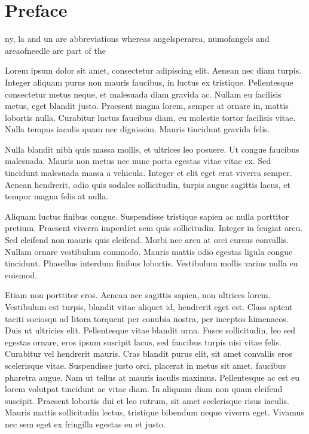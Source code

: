 \chapter*{Preface}

\gls{ny}, \gls{la} and \gls{un} are abbreviations whereas
\gls{angelsperarea}, \gls{numofangels} and \gls{areaofneedle} are part of the %

Lorem ipsum dolor sit amet, consectetur adipiscing elit. Aenean nec diam turpis. Integer aliquam purus non mauris faucibus, in luctus ex tristique. Pellentesque consectetur metus neque, et malesuada diam gravida ac. Nullam eu facilisis metus, eget blandit justo. Praesent magna lorem, semper at ornare in, mattis lobortis nulla. Curabitur luctus faucibus diam, eu molestie tortor facilisis vitae. Nulla tempus iaculis quam nec dignissim. Mauris tincidunt gravida felis. 

Nulla blandit nibh quis massa mollis, et ultrices leo posuere. Ut congue faucibus malesuada. Mauris non metus nec nunc porta egestas vitae vitae ex. Sed tincidunt malesuada massa a vehicula. Integer et elit eget erat viverra semper. Aenean hendrerit, odio quis sodales sollicitudin, turpis augue sagittis lacus, et tempor magna felis at nulla.

Aliquam luctus finibus congue. Suspendisse tristique sapien ac nulla porttitor pretium. Praesent viverra imperdiet sem quis sollicitudin. Integer in feugiat arcu. Sed eleifend non mauris quis eleifend. Morbi nec arcu at orci cursus convallis. Nullam ornare vestibulum commodo. Mauris mattis odio egestas ligula congue tincidunt. Phasellus interdum finibus lobortis. Vestibulum mollis varius nulla eu euismod.

Etiam non porttitor eros. Aenean nec sagittis sapien, non ultrices lorem. Vestibulum est turpis, blandit vitae aliquet id, hendrerit eget est. Class aptent taciti sociosqu ad litora torquent per conubia nostra, per inceptos himenaeos. Duis ut ultricies elit. Pellentesque vitae blandit urna. Fusce sollicitudin, leo sed egestas ornare, eros ipsum suscipit lacus, sed faucibus turpis nisi vitae felis. Curabitur vel hendrerit mauris. Cras blandit purus elit, sit amet convallis eros scelerisque vitae. Suspendisse justo orci, placerat in metus sit amet, faucibus pharetra augue. Nam ut tellus at mauris iaculis maximus. Pellentesque ac est eu lorem volutpat tincidunt ac vitae diam. In aliquam diam non quam eleifend suscipit. Praesent lobortis dui et leo rutrum, sit amet scelerisque risus iaculis. Mauris mattis sollicitudin lectus, tristique bibendum neque viverra eget. Vivamus nec sem eget ex fringilla egestas eu et justo.

